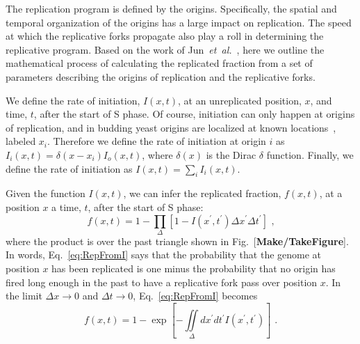 		The replication program is defined by the origins.
		Specifically, the spatial and temporal organization of the origins has a large impact on replication.
		The speed at which the replicative forks propagate also play a roll in determining the replicative program.
		Based on the work of Jun~\emph{et~al.}~\cite{KJMA1}, here we outline the mathematical process of calculating the replicated fraction from a set of parameters describing the origins of replication and the replicative forks.
		
		We define the rate of initiation, $I(x,t)$, at an unreplicated position, $x$, and time, $t$, after the start of S phase.
		Of course, initiation can only happen at origins of replication, and in budding yeast origins are localized at known locations~\cite{OriDB}, labeled $x_i$.
		Therefore we define the rate of initiation at origin $i$ as $I_i(x,t)=\delta(x-x_i)I_o(x,t)$, where $\delta(x)$ is the Dirac $\delta$ function.
		Finally, we define the rate of initiation as $I(x,t) = \sum\limits_i I_i(x,t)$.
		
		Given the function $I(x,t)$, we can infer the replicated fraction, $f(x,t)$, at a position $x$ a time, $t$, after the start of S phase:
		\begin{equation} \label{eq:RepFromI}
			f\left( x,t\right) = 1 - \prod_\Delta\left[1-I\left( x^\prime,t^\prime\right)\Delta x^\prime\Delta t^\prime\right] \text{ ,}
		\end{equation}
		where the product is over the past triangle shown in Fig.~[\textbf{Make/TakeFigure}].
		In words, Eq.~\ref{eq:RepFromI} says that the probability that the genome at position $x$ has been replicated is one minus the probability that no origin has fired long enough in the past to have a replicative fork pass over position $x$.
		In the limit $\Delta x\rightarrow0$ and $\Delta t\rightarrow0$, Eq.~\ref{eq:RepFromI} becomes
		\begin{equation} \label{eq:RepFromIexp}
			f\left( x,t\right) = 1 - \exp\left[-\iint\limits_\Delta dx^\prime dt^\prime I\left( x^\prime,t^\prime\right)\right] \text{ .}
		\end{equation}
		
